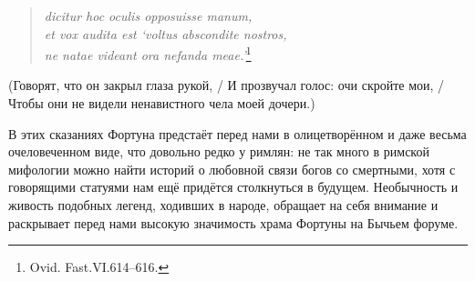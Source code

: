 \begin{verse}
\textit{dicitur hoc oculis opposuisse manum,\\
et vox audita est `voltus abscondite nostros,\\
ne natae videant ora nefanda meae.'}\footnote{Ovid. Fast.VI.614--616.}
\end{verse}

(Говорят, что он закрыл глаза рукой, / И прозвучал голос: очи скройте мои, / Чтобы они не видели ненавистного чела моей дочери.)

В этих сказаниях Фортуна предстаёт перед нами в олицетворённом и даже весьма очеловеченном виде, что довольно редко у римлян: не так много в римской мифологии можно найти историй о любовной связи богов со смертными, хотя с говорящими статуями нам ещё придётся столкнуться в будущем. Необычность и живость подобных легенд, ходивших в народе, обращает на себя внимание и раскрывает перед нами высокую значимость храма Фортуны на Бычьем форуме.








